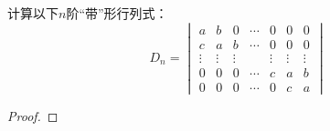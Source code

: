 \begin{problem}
计算以下\(n\)阶“带”形行列式：
\begin{equation*}
    D_n=
    \begin{vmatrix}
        a      & b      & 0      & \cdots & 0      & 0      & 0      \\
        c      & a      & b      & \cdots & 0      & 0      & 0      \\
        \vdots & \vdots & \vdots &        & \vdots & \vdots & \vdots \\
        0      & 0      & 0      & \cdots & c      & a      & b      \\
        0      & 0      & 0      & \cdots & 0      & c      & a
    \end{vmatrix}
\end{equation*}
\end{problem}
\begin{proof}
\end{proof}

